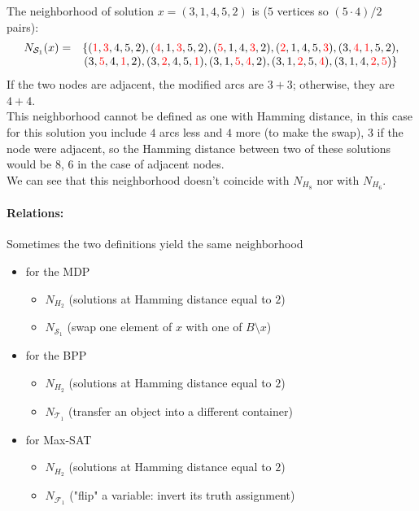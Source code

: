 \documentclass[11pt]{article}
\begin{document}
	The neighborhood of solution $x = (3, 1, 4, 5, 2)$ is ($5$ vertices so $(5 \cdot 4) / 2$ pairs):
	$$ \begin{array}{c c}
		N_{\mathcal{S}_1} (x) = & \{({\color{red} 1}, {\color{red} 3}, 4, 5, 2) , ({\color{red} 4}, 1, {\color{red} 3}, 5, 2) , ({\color{red} 5}, 1, 4, {\color{red} 3}, 2) , ({\color{red} 2}, 1, 4, 5, {\color{red} 3}) , (3, {\color{red} 4}, {\color{red} 1}, 5, 2) , \\
		& (3, {\color{red} 5}, 4, {\color{red} 1}, 2) , (3, {\color{red} 2}, 4, 5, {\color{red} 1}) , (3, 1, {\color{red} 5}, {\color{red} 4}, 2) , (3, 1, {\color{red} 2}, 5, {\color{red} 4}) , (3, 1, 4, {\color{red} 2}, {\color{red} 5}) \}
	\end{array} $$
	If the two nodes are adjacent, the modified arcs are $3 + 3$; otherwise, they are $4 + 4$.\\
	
	This neighborhood cannot be defined as one with Hamming distance, in this case for this solution you include $4$ arcs less and $4$ more (to make the swap), $3$ if the node were adjacent, so the Hamming distance between two of these solutions would be $8$, $6$ in the case of adjacent nodes.\\
	We can see that this neighborhood doesn't coincide with $N_{H_8}$ nor with $N_{H_6}$.\\
	
	\newpage
	
	\paragraph{Relations:} Sometimes the two definitions yield the same neighborhood
	\begin{itemize}
		\item for the MDP
		\begin{itemize}
			\item $N_{H_2}$ (solutions at Hamming distance equal to $2$)
			\item $N_{\mathcal{S}_1}$ (swap one element of $x$ with one of $B \setminus x$)
		\end{itemize}
		\nn
		
		\item for the BPP
		\begin{itemize}
			\item $N_{H_2}$ (solutions at Hamming distance equal to $2$)
			\item $N_{\mathcal{T}_1}$ (transfer an object into a different container)
		\end{itemize}
		\nn
		
		\item for Max-SAT
		\begin{itemize}
			\item $N_{H_2}$ (solutions at Hamming distance equal to $2$)
			\item $N_{\mathcal{F}_1}$ ("flip" a variable: invert its truth assignment)
		\end{itemize}
		\nn
	\end{itemize}
	
\end{document}
